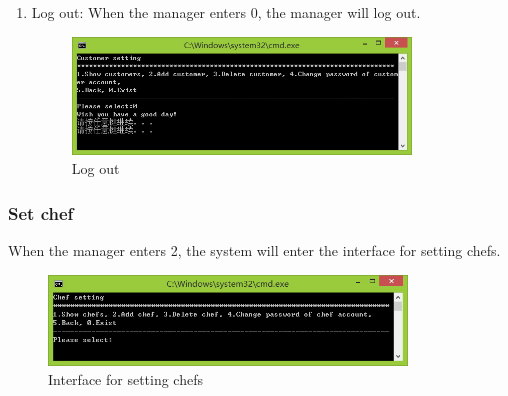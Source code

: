 \documentclass{article}
\begin{document}
\begin{enumerate}
    \item Log out:\newline
    When the manager enters 0, the manager will log out.
        \begin{figure}[H]
        \centering
        \includegraphics[width=0.85\textwidth]{A/A0.jpg}
        \caption{Log out}
        \end{figure}
    
\end{enumerate}


\subsubsection{Set chef}
When the manager enters 2, the system will enter the interface for setting chefs.
\begin{figure}[H]
    \centering
    \includegraphics[width=0.85\textwidth]{B/02.jpg}
    \caption{Interface for setting chefs}
\end{figure}
\end{document}
